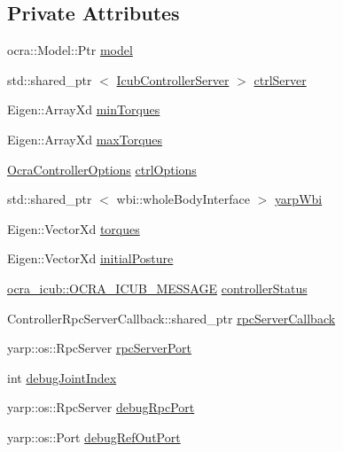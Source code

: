 \subsection*{\-Private \-Attributes}
\begin{DoxyCompactItemize}
\item 
ocra\-::\-Model\-::\-Ptr \hyperlink{classThread_a1dcef9aedc1a707e6f04d5fb6e4a0b13}{model}
\item 
std\-::shared\-\_\-ptr\*
$<$ \hyperlink{classIcubControllerServer}{\-Icub\-Controller\-Server} $>$ \hyperlink{classThread_ace1179249de64e545f43dc48529fbbb6}{ctrl\-Server}
\item 
\-Eigen\-::\-Array\-Xd \hyperlink{classThread_a414015415c64371877d6028417c4f9e2}{min\-Torques}
\item 
\-Eigen\-::\-Array\-Xd \hyperlink{classThread_af28a4fcbbcbf77c42237c0be75a25a54}{max\-Torques}
\item 
\hyperlink{classOcraControllerOptions}{\-Ocra\-Controller\-Options} \hyperlink{classThread_af96a166364f0c6a680115600b3bd232e}{ctrl\-Options}
\item 
std\-::shared\-\_\-ptr\*
$<$ wbi\-::whole\-Body\-Interface $>$ \hyperlink{classThread_aa3f4bbc2dca15c247a13de1bdbc4f7a3}{yarp\-Wbi}
\item 
\-Eigen\-::\-Vector\-Xd \hyperlink{classThread_a3238993799b36af06f3858a3f65dcf1e}{torques}
\item 
\-Eigen\-::\-Vector\-Xd \hyperlink{classThread_aa59863bb50c8aa88fe5872e75be44cb7}{initial\-Posture}
\item 
\hyperlink{namespaceocra__icub_afbd2db66b68005fb7cfac19210caf83f}{ocra\-\_\-icub\-::\-O\-C\-R\-A\-\_\-\-I\-C\-U\-B\-\_\-\-M\-E\-S\-S\-A\-G\-E} \hyperlink{classThread_a913cf23e86cdaefd036b782f7417254d}{controller\-Status}
\item 
\-Controller\-Rpc\-Server\-Callback\-::shared\-\_\-ptr \hyperlink{classThread_a602de8d12886c9c57b5420c83804a38b}{rpc\-Server\-Callback}
\item 
yarp\-::os\-::\-Rpc\-Server \hyperlink{classThread_adbec1b4f2c8fc40641df6f118e93fd25}{rpc\-Server\-Port}
\item 
int \hyperlink{classThread_aedf960b8e991868561f35193702245b0}{debug\-Joint\-Index}
\item 
yarp\-::os\-::\-Rpc\-Server \hyperlink{classThread_aa6b8f3712e7776d560b0a535eff73c34}{debug\-Rpc\-Port}
\item 
yarp\-::os\-::\-Port \hyperlink{classThread_a3780b51f82c50fd2738afbd0ae9b9526}{debug\-Ref\-Out\-Port}
\item 

\end{DoxyCompactItemize}
